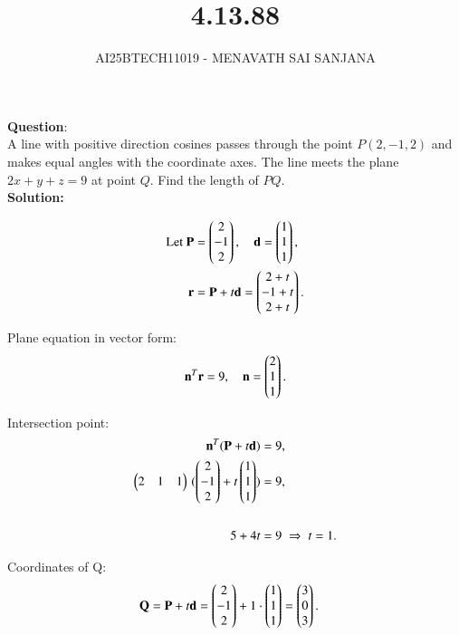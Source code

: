 \documentclass[journal]{IEEEtran}
\begin{document}

\vspace{3cm}

\title{4.13.88}
\author{AI25BTECH11019 - MENAVATH SAI SANJANA}
{\let\newpage\relax\maketitle}

\renewcommand{\thefigure}{\theenumi}
\renewcommand{\thetable}{\theenumi}
\setlength{\intextsep}{10pt} 

\renewcommand{\thetable}{\theenumi}

\textbf{Question}:\\
A line with positive direction cosines passes through the point 
$P(2,-1,2)$ and makes equal angles with the coordinate axes.  
The line meets the plane $2x+y+z=9$ at point $Q$.  
Find the length of $PQ$.  
\\
\bigskip
\textbf{Solution: }

\begin{align}
\text{Let } \mathbf{P} &= \begin{pmatrix}2\\-1\\2\end{pmatrix}, \quad \mathbf{d} = \begin{pmatrix}1\\1\\1\end{pmatrix}, \\
\mathbf{r} &= \mathbf{P} + t\mathbf{d} = \begin{pmatrix}2+t\\-1+t\\2+t\end{pmatrix}.
\end{align}

Plane equation in vector form:
\begin{align}
\mathbf{n}^T \mathbf{r} = 9, \quad \mathbf{n} = \begin{pmatrix}2\\1\\1\end{pmatrix}.
\end{align}

Intersection point:
\begin{align}
\mathbf{n}^T (\mathbf{P} + t \mathbf{d}) &= 9,\\
\begin{pmatrix}2 & 1 & 1\end{pmatrix} \, (\begin{pmatrix}2\\-1\\2\end{pmatrix} + t \begin{pmatrix}1\\1\\1\end{pmatrix}) &= 9,\\
\\
5 + 4t &= 9 \;\Rightarrow\; t = 1.
\end{align}

Coordinates of Q:
\begin{align}
\mathbf{Q} &= \mathbf{P} + t \mathbf{d} = \begin{pmatrix}2\\-1\\2\end{pmatrix} + 1 \cdot \begin{pmatrix}1\\1\\1\end{pmatrix} = \begin{pmatrix}3\\0\\3\end{pmatrix}.
\end{align}
\end{document}
